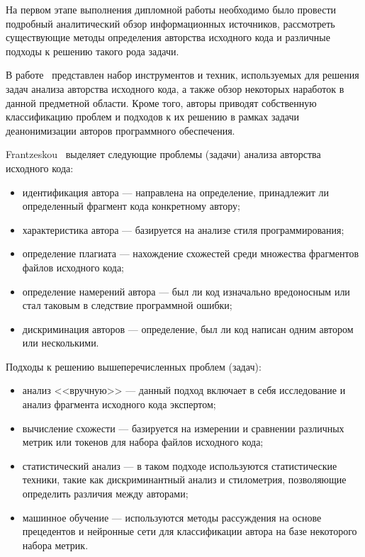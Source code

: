 На первом этапе выполнения дипломной работы необходимо было провести подробный аналитический обзор информационных источников, 
рассмотреть существующие методы определения авторства исходного кода и различные подходы к решению 
такого рода задачи. 

В работе~\cite{frantz} представлен набор инструментов и техник, используемых для решения задач 
анализа авторства исходного кода, а также обзор некоторых наработок в данной предметной области. 
Кроме того, авторы приводят собственную классификацию проблем и подходов к их решению в рамках 
задачи деанонимизации авторов программного обеспечения. 

Frantzeskou~\cite{frantz} выделяет следующие проблемы (задачи) анализа авторства исходного кода:
\begin{itemize}
  \item идентификация автора --- направлена на определение, принадлежит ли определенный фрагмент кода конкретному автору;
  \item характеристика автора --- базируется на анализе стиля программирования; 
  \item определение плагиата --- нахождение схожестей среди множества фрагментов файлов исходного кода;
  \item определение намерений автора --- был ли код изначально вредоносным или стал таковым в следствие программной ошибки;
  \item дискриминация авторов --- определение, был ли код написан одним автором или несколькими.
\end{itemize}

Подходы к решению вышеперечисленных проблем (задач):
\begin{itemize}
  \item анализ <<вручную>> --- данный подход включает в себя исследование и анализ фрагмента исходного кода экспертом; 
  \item вычисление схожести --- базируется на измерении и сравнении различных метрик или токенов для набора файлов исходного кода;
  \item статистический анализ --- в таком подходе используются статистические техники, такие как дискриминантный анализ и стилометрия, позволяющие определить различия между авторами;
  \item машинное обучение --- используются методы рассуждения на основе прецедентов и нейронные сети для классификации автора на базе некоторого набора метрик.
\end{itemize}

